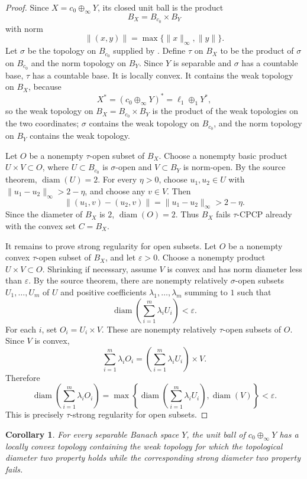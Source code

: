 \documentclass[11pt]{article}
\newtheorem{corollary}{Corollary}
\newcommand{\eps}{\varepsilon}
\newcommand{\diam}{\operatorname{diam}}
\newcommand{\cnull}{c_0}
\begin{document}
\begin{proof}
Since \(X=\cnull\oplus_\infty Y\), its closed unit ball is the product
\[
   B_X=B_{\cnull}\times B_Y
\]
with norm
\[
   \|(x,y)\|=\max\{\|x\|_{\infty},\|y\|\}.
\]
Let \(\sigma\) be the topology on \(B_{\cnull}\) supplied by
\cite[Theorem 3.2]{LPM}. Define \(\tau\) on \(B_X\) to be the product of
\(\sigma\) on \(B_{\cnull}\) and the norm topology on \(B_Y\). Since \(Y\) is
separable and \(\sigma\) has a countable base, \(\tau\) has a countable base.
It is locally convex. It contains the weak topology on \(B_X\), because
\[
   X^*=(\cnull\oplus_\infty Y)^*=\ell_1\oplus_1 Y^*,
\]
so the weak topology on \(B_X=B_{\cnull}\times B_Y\) is the product of the weak
topologies on the two coordinates; \(\sigma\) contains the weak topology on
\(B_{\cnull}\), and the norm topology on \(B_Y\) contains the weak topology.

Let \(O\) be a nonempty \(\tau\)-open subset of \(B_X\). Choose a nonempty
basic product \(U\times V\subset O\), where \(U\subset B_{\cnull}\) is
\(\sigma\)-open and \(V\subset B_Y\) is norm-open. By the source theorem,
\(\diam(U)=2\). For every \(\eta>0\), choose \(u_1,u_2\in U\) with
\(\|u_1-u_2\|_\infty>2-\eta\), and choose any \(v\in V\). Then
\[
   \|(u_1,v)-(u_2,v)\|=\|u_1-u_2\|_\infty>2-\eta.
\]
Since the diameter of \(B_X\) is \(2\), \(\diam(O)=2\). Thus \(B_X\) fails
\(\tau\)-CPCP already with the convex set \(C=B_X\).

It remains to prove strong regularity for open subsets. Let \(O\) be a nonempty
convex \(\tau\)-open subset of \(B_X\), and let \(\eps>0\). Choose a nonempty
product \(U\times V\subset O\). Shrinking if necessary, assume \(V\) is convex
and has norm diameter less than \(\eps\). By the source theorem, there are
nonempty relatively \(\sigma\)-open subsets \(U_1,\dots,U_m\) of \(U\) and
positive coefficients \(\lambda_1,\dots,\lambda_m\) summing to \(1\) such that
\[
   \diam\left(\sum_{i=1}^m\lambda_i U_i\right)<\eps .
\]
For each \(i\), set \(O_i=U_i\times V\). These are nonempty relatively
\(\tau\)-open subsets of \(O\). Since \(V\) is convex,
\[
   \sum_{i=1}^m\lambda_i O_i
   =
   \left(\sum_{i=1}^m\lambda_i U_i\right)\times V.
\]
Therefore
\[
   \diam\left(\sum_{i=1}^m\lambda_i O_i\right)
   =
   \max\left\{
      \diam\left(\sum_{i=1}^m\lambda_i U_i\right),
      \diam(V)
   \right\}
   <\eps.
\]
This is precisely \(\tau\)-strong regularity for open subsets.
\end{proof}

\begin{corollary}
For every separable Banach space \(Y\), the unit ball of
\(\cnull\oplus_\infty Y\) has a locally convex topology containing the weak
topology for which the topological diameter two property holds while the
corresponding strong diameter two property fails.
\end{corollary}
\end{document}
